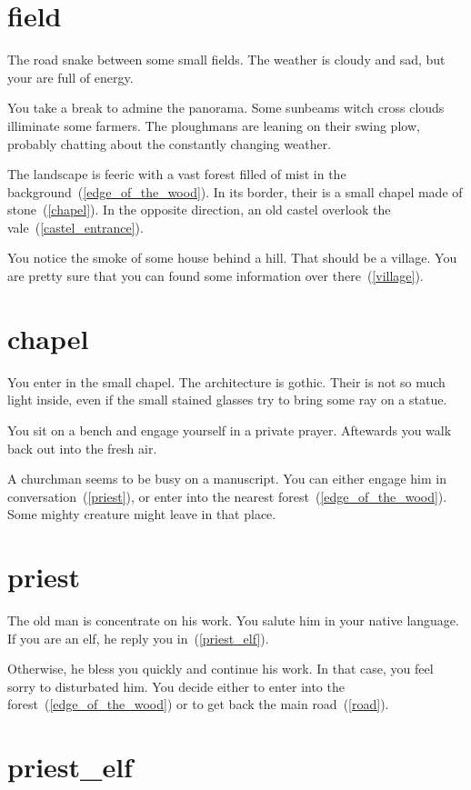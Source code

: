 \section{field}

The road snake between some small fields. The weather is cloudy and sad, but
your are full of energy.

You take a break to admine the panorama. Some sunbeams witch cross clouds
illiminate some farmers. The ploughmans are leaning on their swing plow,
probably chatting about the constantly changing weather.

The landscape is feeric with a vast forest filled of mist in the
background~(\ref{edge_of_the_wood}). In its border, their is a small chapel made
of stone~(\ref{chapel}). In the opposite direction, an old castel overlook the
vale~(\ref{castel_entrance}).

You notice the smoke of some house behind a hill. That should be a village. You
are pretty sure that you can found some information over there~(\ref{village}).

\section{chapel}

You enter in the small chapel. The architecture is gothic. Their is not so much
light inside, even if the small stained glasses try to bring some ray on a
statue.

You sit on a bench and engage yourself in a private prayer. Aftewards you walk
back out into the fresh air.

A churchman seems to be busy on a manuscript. You can either engage him in
conversation~(\ref{priest}), or enter into the nearest
forest~(\ref{edge_of_the_wood}). Some mighty creature might leave in that place.

\section{priest}

The old man is concentrate on his work. You salute him in your native language.
If you are an elf, he reply you in~(\ref{priest_elf}).

Otherwise, he bless you quickly and continue his work. In that case, you feel
sorry to disturbated him. You decide either to enter into the
forest~(\ref{edge_of_the_wood}) or to get back the main road~(\ref{road}).

\section{priest_elf}

